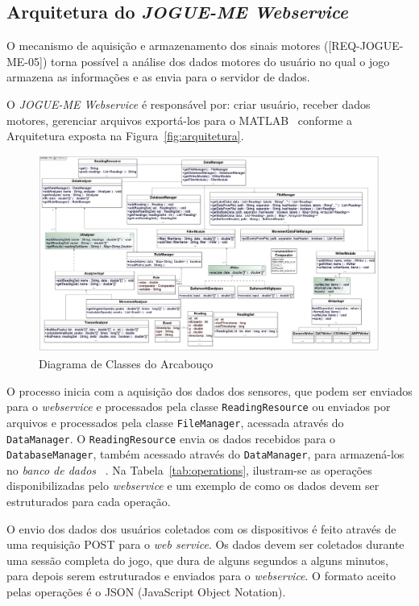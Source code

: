 \subsection{Arquitetura do \textit{JOGUE-ME Webservice}}
O mecanismo de aquisição e armazenamento dos sinais motores ([REQ-JOGUE-ME-05]) torna possível a análise dos dados motores do usuário no qual o jogo armazena as informações e as envia para o servidor de dados. 

O \textit{JOGUE-ME Webservice} é responsável por: criar usuário, receber dados motores, gerenciar arquivos exportá-los para o MATLAB~\cite{matlab2011} conforme a Arquitetura exposta na Figura~\ref{fig:arquitetura}.

\begin{figure}[!htb]
     \centering
     \includegraphics[width=1\textwidth]{./img/class_diagram.png}
     \caption[Diagrama de Classes do Arcabouço]{Diagrama de Classes do Arcabouço ~\cite{antonio2013}}
     \label{img:classd}
\end{figure}

O processo inicia com a aquisição dos dados dos sensores, que podem ser enviados para o \emph{webservice} e processados pela classe \texttt{ReadingResource} ou enviados por arquivos e processados pela classe \texttt{FileManager}, acessada através do \texttt{DataManager}. O \texttt{ReadingResource} envia os dados recebidos para o \texttt{DatabaseManager}, também acessado através do \texttt{DataManager}, para armazená-los no \emph{banco de dados} ~\cite{antonio2013}. Na Tabela~\ref{tab:operations}, ilustram-se as operações disponibilizadas pelo \textit{webservice} e um exemplo de como os dados devem ser estruturados para cada operação.

O envio dos dados dos usuários coletados com os dispositivos é feito através de uma requisição POST para o \textit{web service}. Os dados devem ser coletados durante uma sessão completa do jogo, que dura de alguns segundos a alguns minutos, para depois serem estruturados e enviados para o \textit{webservice}. O formato aceito pelas operações é o JSON (JavaScript Object Notation). 

